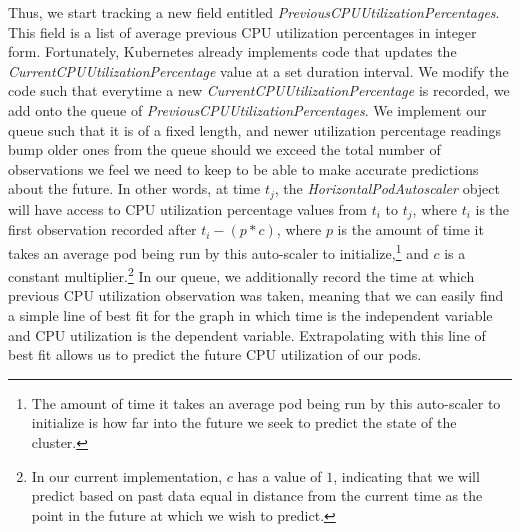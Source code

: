Thus, we start tracking a new field entitled
\textit{PreviousCPUUtilizationPercentages}. This field is a list of average previous CPU
utilization percentages in integer form. Fortunately, Kubernetes already
implements code that updates the \textit{CurrentCPUUtilizationPercentage} value
at a set duration interval. We modify the code such that everytime a new
\textit{CurrentCPUUtilizationPercentage} is recorded, we add onto the queue of
\textit{PreviousCPUUtilizationPercentages}. We implement our queue such that it
is of a fixed length, and newer utilization percentage readings bump older ones
from the queue should we exceed the total number of observations we feel we need
to keep to be able to make accurate predictions about the future. In other words, at time
$t_{j}$, the \textit{HorizontalPodAutoscaler} object will have access to
CPU utilization percentage values from $t_{i}$ to $t_{j}$, where $t_{i}$ is the
first observation recorded after $t_{i} - (p * c)$, where $p$ is the
amount of time it takes an
average pod being run by this auto-scaler to initialize,\footnote{The
amount of time it takes an
average pod being run by this auto-scaler to initialize is how far into the
future we seek to predict the state of the cluster.} and $c$ is a constant
multiplier.\footnote{In our current implementation, $c$ has a value of
$1$, indicating that we will predict based on past data equal in distance from
the current time as the point in the future at which we wish to predict.}
In our queue, we additionally record the time at which previous CPU utilization
observation was taken, meaning that we can easily find a simple line of best fit
for the graph in which time is the independent variable and CPU utilization is
the dependent variable. Extrapolating with this line of best fit allows us to
predict the future CPU utilization of our pods.
